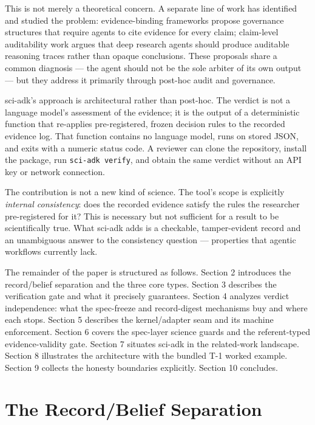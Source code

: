 \documentclass[11pt]{article}
\begin{document}
This is not merely a theoretical concern. A separate line of work has identified and studied the problem: evidence-binding frameworks \citep{evibound} propose governance structures that require agents to cite evidence for every claim; claim-level auditability work \citep{aar} argues that deep research agents should produce auditable reasoning traces rather than opaque conclusions. These proposals share a common diagnosis --- the agent should not be the sole arbiter of its own output --- but they address it primarily through post-hoc audit and governance.

sci-adk's approach is architectural rather than post-hoc. The verdict is not a language model's assessment of the evidence; it is the output of a deterministic function that re-applies pre-registered, frozen decision rules to the recorded evidence log. That function contains no language model, runs on stored JSON, and exits with a numeric status code. A reviewer can clone the repository, install the package, run \texttt{sci-adk verify}, and obtain the same verdict without an API key or network connection.

The contribution is not a new kind of science. The tool's scope is explicitly \textit{internal consistency}: does the recorded evidence satisfy the rules the researcher pre-registered for it? This is necessary but not sufficient for a result to be scientifically true. What sci-adk adds is a checkable, tamper-evident record and an unambiguous answer to the consistency question --- properties that agentic workflows currently lack.

The remainder of the paper is structured as follows. Section 2 introduces the record/belief separation and the three core types. Section 3 describes the verification gate and what it precisely guarantees. Section 4 analyzes verdict independence: what the spec-freeze and record-digest mechanisms buy and where each stops. Section 5 describes the kernel/adapter seam and its machine enforcement. Section 6 covers the spec-layer science guards and the referent-typed evidence-validity gate. Section 7 situates sci-adk in the related-work landscape. Section 8 illustrates the architecture with the bundled T-1 worked example. Section 9 collects the honesty boundaries explicitly. Section 10 concludes.

\section{The Record/Belief Separation}
\end{document}
